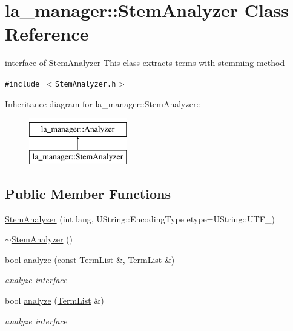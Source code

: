 \hypertarget{classla__manager_1_1StemAnalyzer}{
\section{la\_\-manager::StemAnalyzer Class Reference}
\label{classla__manager_1_1StemAnalyzer}
}
interface of \hyperlink{classla__manager_1_1StemAnalyzer}{StemAnalyzer} This class extracts terms with stemming method  


{\tt \#include $<$StemAnalyzer.h$>$}

Inheritance diagram for la\_\-manager::StemAnalyzer::\begin{figure}[H]
\begin{center}
\leavevmode
\includegraphics[height=2cm]{classla__manager_1_1StemAnalyzer}
\end{center}
\end{figure}
\subsection*{Public Member Functions}
\begin{CompactItemize}
\item 
\hyperlink{classla__manager_1_1StemAnalyzer_61ce978ad675e7c304a474ce072bbd37}{StemAnalyzer} (int lang, UString::EncodingType etype=UString::UTF\_)
\item 
\hyperlink{classla__manager_1_1StemAnalyzer_8a0db479e0cb751532c54dfd717024cb}{$\sim$StemAnalyzer} ()
\item 
bool \hyperlink{classla__manager_1_1StemAnalyzer_bd1334a97df94c78f58a02a7af73d55a}{analyze} (const \hyperlink{namespacela__manager_06c0aab93982ee3ebc3ef9d0419e619a}{TermList} \&, \hyperlink{namespacela__manager_06c0aab93982ee3ebc3ef9d0419e619a}{TermList} \&)
\begin{CompactList}\small\item\em analyze interface \item\end{CompactList}\item 
bool \hyperlink{classla__manager_1_1StemAnalyzer_a3ad462a3d098e7abfbab604b47d1f21}{analyze} (\hyperlink{namespacela__manager_06c0aab93982ee3ebc3ef9d0419e619a}{TermList} \&)
\begin{CompactList}\small\item\em analyze interface \item\end{CompactList}\end{CompactItemize}
